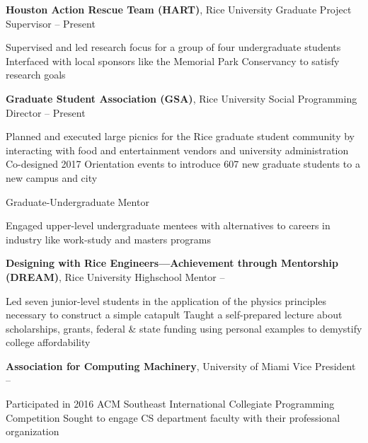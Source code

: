 \documentclass[letterpaper,MMMyyyy,nonstopmode]{simpleresumecv}
\begin{document}
\begin{Body}


\Entry
\textbf{Houston Action Rescue Team (HART)}, Rice University
\Gap
\BulletItem Graduate Project Supervisor
\hfill {} -- Present
\begin{Detail}
\SubBulletItem Supervised and led research focus for a group of four undergraduate students 
\SubBulletItem Interfaced with local sponsors like the Memorial Park Conservancy to satisfy research goals
\end{Detail}

\pagebreak

\Entry
\textbf{Graduate Student Association (GSA)}, Rice University
\Gap
\BulletItem Social Programming Director
\hfill {} -- Present
\begin{Detail}
\SubBulletItem Planned and executed large picnics for the Rice graduate student community by interacting with food and entertainment vendors and university administration
\SubBulletItem Co-designed 2017 Orientation events to introduce 607 new graduate students to a new campus and city
\end{Detail}
\BulletItem Graduate-Undergraduate Mentor
\begin{Detail}
\SubBulletItem Engaged upper-level undergraduate mentees with alternatives to careers in industry like work-study and masters programs
\end{Detail}

\Entry
\textbf{Designing with Rice Engineers---Achievement through Mentorship (DREAM)}, Rice University
\Gap
\BulletItem Highschool Mentor
\hfill {} -- 
\begin{Detail}
\SubBulletItem Led seven junior-level students in the application of the physics principles necessary to construct a simple catapult
\SubBulletItem Taught a self-prepared lecture about scholarships, grants, federal \& state funding using personal examples to demystify college affordability
\end{Detail}

\Entry
\textbf{Association for Computing Machinery}, University of Miami
\Gap
\BulletItem Vice President
\hfill {} -- 
\begin{Detail}
\SubBulletItem Participated in 2016 ACM Southeast International Collegiate Programming Competition
\SubBulletItem Sought to engage CS department faculty with their professional organization
\end{Detail}


\end{Body}
\end{document}
